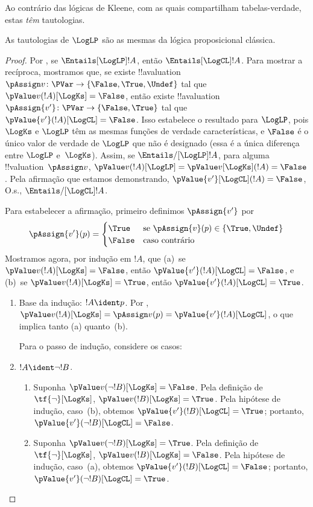 \documentclass[../../../include/open-logic-section]{subfiles}
\begin{document}
Ao contrário das lógicas de Kleene, com as quais compartilham tabelas-verdade,
estas \emph{têm} tautologias. 

\begin{prop} As tautologias de $\LogLP$ são
  as mesmas da lógica proposicional clássica.
\end{prop}

\begin{proof}
  Por , se $\Entails[\LogLP] !A$, então
  $\Entails[\LogCL] !A$. Para mostrar a recíproca, mostramos que, se existe
  !!a{valuation}~$\pAssign v\colon \PVar \to \{\False, \True,
  \Undef\}$ tal que $\pValue v(!A)[\LogKs] = \False$, então existe
  !!a{valuation}~$\pAssign {v'}\colon \PVar \to \{\False, \True\}$
  tal que $\pValue {v'}(!A)[\LogCL] = \False$. Isso estabelece o
  resultado para $\LogLP$, pois $\LogKs$ e $\LogLP$ têm as mesmas
  funções de verdade características, e $\False$ é o único valor de verdade
  de $\LogLP$ que não é designado (essa é a única diferença
  entre $\LogLP$ e~$\LogKs$). Assim, se $\Entails/[\LogLP] !A$, para
  alguma !!{valuation}~$\pAssign v$, $\pValue v(!A)[\LogLP] = \pValue
  v[\LogKs](!A) = \False$. Pela afirmação que estamos demonstrando,
  $\pValue{v'}[\LogCL](!A) = \False$, O.s.\@, $\Entails/[\LogCL] !A$.
  
  Para estabelecer a afirmação, primeiro definimos $\pAssign {v'}$ por
  \[
    \pAssign {v'}(p) = 
    \begin{cases}
    \True & \text{se } \pAssign {v}(p) \in \{\True, \Undef\}\\
    \False & \text{caso contrário}
  \end{cases}
  \]
  Mostramos agora, por indução em $!A$, que (a)~se $\pValue v(!A)[\LogKs]
  = \False$, então $\pValue {v'}(!A)[\LogCL] = \False$, e (b)~se
  $\pValue v(!A)[\LogKs] = \True$, então $\pValue {v'}(!A)[\LogCL] =
  \True$.
  \begin{enumerate}
    \item Base da indução: $!A \ident p$. Por
    , $\pValue v(!A)[\LogKs]
    = \pAssign v(p) = \pValue {v'}(!A)[\LogCL]$, o que implica tanto (a)
    quanto~(b).
    
    Para o passo de indução, considere os casos:
    \item $!A \ident \lnot !B$. 
    \begin{enumerate}
      \item Suponha $\pValue v(\lnot!B)[\LogKs] = \False$. Pela
      definição de $\tf{\lnot}[\LogKs]$, $\pValue v(!B)[\LogKs]  =
      \True$. Pela hipótese de indução, caso~(b), obtemos $\pValue
      {v'}(!B)[\LogCL]  = \True$; portanto, $\pValue {v'}(\lnot !B)[\LogCL] = \False$.
      \item Suponha $\pValue v(\lnot!B)[\LogKs] = \True$. Pela
      definição de $\tf{\lnot}[\LogKs]$, $\pValue v(!B)[\LogKs]  =
      \False$. Pela hipótese de indução, caso~(a), obtemos $\pValue
      {v'}(!B)[\LogCL]  = \False$; portanto, $\pValue {v'}(\lnot !B)[\LogCL] = \True$.
    \end{enumerate}


\end{enumerate}
\end{proof}
\end{document}
